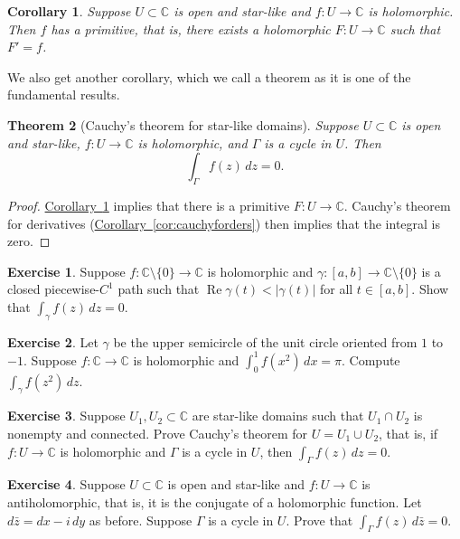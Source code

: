 \documentclass[12pt,openany]{book}
\renewcommand{\Re}{\operatorname{Re}}
\newcommand{\sabs}[1]{\lvert {#1} \rvert}
\newcommand{\C}{{\mathbb{C}}}
\theoremstyle{plain}
\newtheorem{thm}{Theorem}[section]
\newtheorem{cor}[thm]{Corollary}
\theoremstyle{remark}
\theoremstyle{definition}
\newenvironment{exbox}{%
    \def\FrameCommand{\vrule width 1pt \relax\hspace{10pt}}%
    \MakeFramed{\advance\hsize-\width\FrameRestore}%
}{%
    \endMakeFramed
}
\theoremstyle{exercise}
\newtheorem{exercise}{Exercise}[section]
\theoremstyle{example}
\newcommand{\corref}[1]{\hyperref[#1]{Corollary~\ref*{#1}}}
\begin{document}
\begin{cor} \label{cor:primitiveinstarlike}
Suppose $U \subset \C$ is open and star-like
and $f \colon U \to \C$ is holomorphic.
Then $f$ has a primitive, that is,
there exists a holomorphic $F \colon U \to \C$
such that $F' = f$.
\end{cor}

We also get another corollary, which we call
a theorem as it is one of the fundamental results.

\begin{thm}[Cauchy's theorem for star-like domains]
%
\label{thm:cauchystarlike}%
Suppose $U \subset \C$ is open and star-like, $f \colon U \to \C$ is holomorphic,
and $\Gamma$ is
a cycle
in $U$.  Then
\begin{equation*}
\int_{\Gamma} f(z) \, dz = 0 .
\end{equation*}
\end{thm}

\begin{proof}
\corref{cor:primitiveinstarlike} implies that there is
a primitive $F \colon U \to \C$.
Cauchy's theorem for derivatives (\corref{cor:cauchyforders}) then implies that the integral is zero.
\end{proof}

\begin{exbox}
\begin{exercise}
Suppose $f \colon \C \setminus \{ 0 \} \to \C$ is holomorphic
and
$\gamma \colon [a,b] \to \C \setminus \{ 0 \}$ is a closed piecewise-$C^1$ path
such that $\Re \gamma(t) < \sabs{\gamma(t)}$ for all $t \in [a,b]$.
Show that $\int_\gamma f(z) \, dz = 0$.
\end{exercise}

\begin{exercise}
Let $\gamma$ be the upper semicircle of the unit circle oriented from $1$ to
$-1$.   Suppose $f \colon \C \to \C$ is holomorphic
and $\int_0^1 f(x^2) \, dx = \pi$.
Compute $\int_\gamma f(z^2) \, dz$.
\end{exercise}

\begin{exercise}
Suppose $U_1, U_2 \subset \C$ are star-like domains such that $U_1 \cap U_2$
is nonempty and connected.  Prove Cauchy's theorem for $U = U_1 \cup U_2$, that is,
if $f \colon U \to \C$ is holomorphic and $\Gamma$ is a cycle in $U$,
then $\int_\Gamma f(z) \, dz = 0$.
\end{exercise}

\begin{exercise}
Suppose $U \subset \C$ is open and star-like and
$f \colon U \to \C$ is antiholomorphic, that is, it is the conjugate of a
holomorphic function.  Let $d\bar{z} = dx - i \, dy$ as before.  Suppose
$\Gamma$ is a cycle in $U$.  Prove that
$\int_\Gamma f(z) \, d\bar{z} = 0$.
\end{exercise}
\end{exbox}
\end{document}

